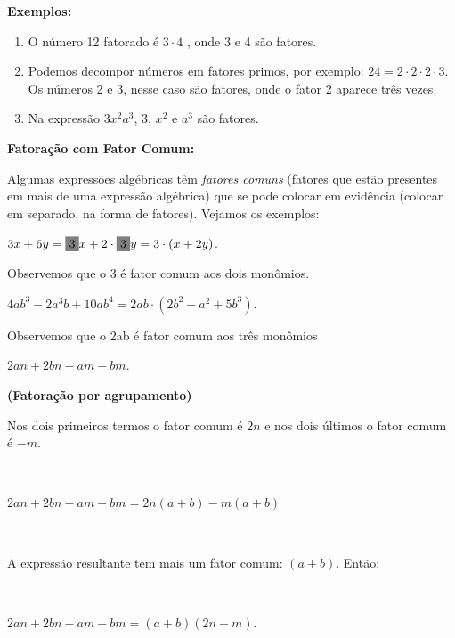 \textbf{Exemplos:}
\begin{enumerate}[label=\alph*)]
\item O número 12 fatorado é $3 \cdot 4$ , onde 3 e 4 são fatores.

\item Podemos decompor números em fatores primos, por exemplo: $24 = 2 \cdot2 \cdot 2 \cdot 3$. Os números 2 e 3, nesse caso são fatores, onde o fator 2 aparece três vezes.

\item Na expressão $3x^2a^3$, 3, $x^2$  e $a^3$ são fatores.
\end{enumerate}

\textbf{Fatoração com Fator Comum:}

Algumas expressões algébricas têm \textit{fatores comuns} (fatores que estão presentes em mais de uma expressão algébrica) que se pode colocar em evidência (colocar em separado, na forma de fatores). Vejamos os exemplos:
\begin{enumerate}[label=\alph*)]
\begin{multicols}{2}
\item $3x + 6y = \colorbox{gray}{3}x + 2 \cdot \colorbox{gray}{3}y = 3 \cdot (x+2y)$.

Observemos que o 3 é fator comum aos dois monômios.
\end{multicols}

\begin{multicols}{2}
\item $4ab^3 - 2a^3b + 10ab^4 = 2ab \cdot (2b^2 - a^2 + 5b^3)$.

Observemos  que o 2ab é fator comum aos três monômios
\end{multicols}

\begin{multicols}{2}
\item $2an + 2bn - am - bm$.

\textbf{(Fatoração por agrupamento)}
\end{multicols}

Nos dois primeiros termos o fator comum é $2n$ e nos dois últimos o fator comum é $-m$.

~~

$2an + 2bn - am - bm = 2n(a+b) - m(a+b)$

~~

A expressão resultante tem mais um fator comum: $(a+b)$. Então:

~~

$2an + 2bn - am - bm = (a+b)(2n-m)$. 
\end{enumerate}

